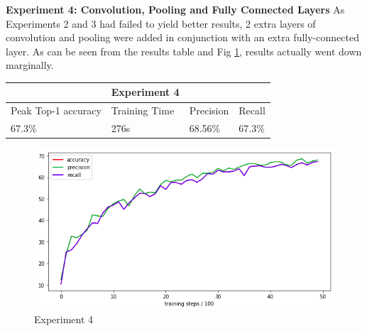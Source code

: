\documentclass[12pt]{report}
\begin{document}
\newpage
\begin{flushleft}
\vspace{0.5cm}
\textbf{Experiment 4: Convolution, Pooling and Fully Connected Layers}
\linebreak
As Experiments 2 and 3 had failed to yield better results, 2 extra layers of convolution and pooling were added in conjunction with an extra fully-connected layer. As can be seen from the results table and Fig \ref{fig:experiment-4}, results actually went down marginally.

\vspace{0.5cm}
\begin{tabular}{llll}
                                          & \multicolumn{1}{c}{Experiment 4}   &                                &                             \\ \hline
\multicolumn{1}{|l|}{Peak Top-1 accuracy} & \multicolumn{1}{l|}{Training Time} & \multicolumn{1}{l|}{Precision} & \multicolumn{1}{l|}{Recall} \\ \hline
\multicolumn{1}{|l|}{67.3\%}              & \multicolumn{1}{l|}{276s}          & \multicolumn{1}{l|}{68.56\%}   & \multicolumn{1}{l|}{67.3\%} \\ \hline
\end{tabular}

\vspace{0.5cm}
\begin{figure}[ht!]
	\centering
	\includegraphics[width=12cm]{experiment-4}
	\caption{Experiment 4}
	\label{fig:experiment-4}
\end{figure}
\end{flushleft}
\end{document}
